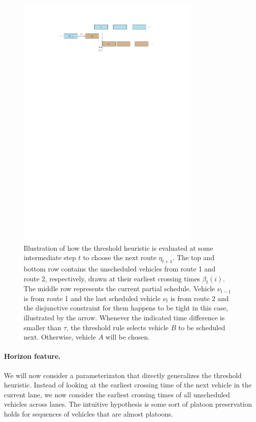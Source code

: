 \documentclass[a4paper]{report}
\theoremstyle{definition}
\theoremstyle{plain}
\begin{document}
\begin{figure}
  \centering
  \includegraphics[width=0.8\textwidth]{figures/single/threshold}
  \caption{Illustration of how the threshold heuristic is evaluated at some
    intermediate step $t$ to choose the next route $\eta_{t+1}$. The top and bottom
    row contains the unscheduled vehicles from route 1 and route 2,
    respectively, drawn at their earliest crossing times $\beta_{t}(i)$. The middle
    row represents the current partial schedule. Vehicle $\nu_{t-1}$ is from
    route 1 and the last scheduled vehicle $\nu_{t}$ is from route 2 and the
    disjunctive constraint for them happens to be tight in this case,
    illustrated by the arrow. Whenever the indicated time difference is smaller
    than $\tau$, the threshold rule selects vehicle $B$ to be scheduled next.
    Otherwise, vehicle $A$ will be chosen.}\label{fig:threshold_heuristic}
\end{figure}

\paragraph{Horizon feature.}

We will now consider a parameterizaton that directly generalizes the
threshold heuristic. Instead of looking at the earliest crossing time of the
next vehicle in the current lane, we now consider the earliest crossing
times of all unscheduled vehicles across lanes.
%
The intuitive hypothesis is some sort of platoon preservation holds for
sequences of vehicles that are almost platoons.
\end{document}
